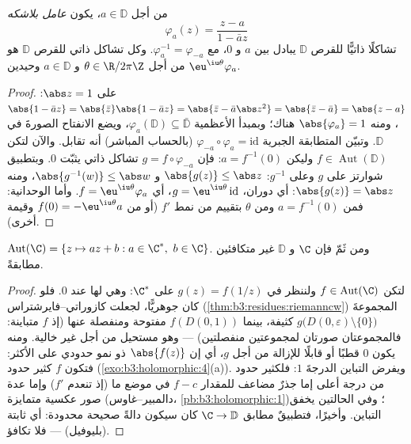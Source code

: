 \begin{theorem}
\label{thm:b3:conformal:autdisc}
من أجل $a \in \mathbb D$، يكون \emph{عامل بلاشكه}
\[
\varphi_a(z) = \frac{z - a}{1 - \bar a z}
\]
تشاكلًا ذاتيًّا للقرص $\mathbb D$ يبادل بين $a$ و $0$، مع
$\varphi_a^{-1} = \varphi_{-a}$. وكل تشاكل ذاتي للقرص $\mathbb D$ هو $\eu^{\iu\theta}\varphi_a$ من أجل
$\theta
\in \R/2\pi\Z$ و $a \in \mathbb D$ وحيدين.
\end{theorem}

\begin{proof}
على $\abs z = 1$: $\abs{1 - \bar az} = \abs{\bar z}\abs{1 -
\bar az} = \abs{\bar z - \bar a\abs z^2} = \abs{\bar z - \bar
a} = \abs{z - a}$، ومنه $\abs{\varphi_a} = 1$ هناك؛ وبمبدأ الأعظمية
$\varphi_a(\mathbb D) \subseteq \bar{\mathbb
D}$، ويضع الانفتاح الصورةَ في $\mathbb D$. وتبيّن المتطابقة
الجبرية $\varphi_{-a}\circ\varphi_a = \mathrm{id}$ (بالحساب المباشر) أنه تقابل. والآن لتكن $f \in
\operatorname{Aut}(\mathbb D)$
وليكن $a = f^{-1}(0)$: فإن $g =
f\circ\varphi_{-a}$ تشاكل ذاتي يثبّت $0$. وبتطبيق
شوارتز على $g$ وعلى $g^{-1}$: $\abs{g(z)} \leq \abs z$ و $\abs{g^{-1}(w)} \leq \abs w$، ومنه $\abs{g(z)} = \abs z$: أي
دوران، $g = \eu^{\iu\theta}\,\mathrm{id}$، أي $f =
\eu^{\iu\theta}\varphi_a$. وأما الوحدانية: فمن $a = f^{-1}(0)$
ومن $\theta$ بتقييم من نمط $f'$ (أو من $f(0) =
-\eu^{\iu\theta}a$ وقيمة أخرى).
\end{proof}

\begin{theorem}
\label{thm:b3:conformal:autplane}
$\operatorname{Aut}(\C) = \{z \mapsto az + b : a \in \C^*,\ b
\in \C\}$. ومن ثَمّ فإن $\C$ و $\mathbb D$ غير متكافئين مطابقةً.
\end{theorem}

\begin{proof}
لتكن $f \in \operatorname{Aut}(\C)$ ولننظر في $g(z) =
f(1/z)$ على $\C^*$: وهي 
لها  عند $0$. فلو كان جوهريًّا، لجعلت
كازوراتي--فايرشتراس (\cref{thm:b3:residues:riemanncw}) المجموعةَ $g\bigl(D(0,\varepsilon)\setminus\{0\}\bigr)$ كثيفة، بينما
$f(D(0, 1))$ مفتوحة ومنفصلة عنها (إذ $f$ متباينة: فالمجموعتان
صورتان لمجموعتين منفصلتين) --- وهو مستحيل من أجل 
 غير خالية. ومنه يكون $0$ قطبًا أو قابلًا
للإزالة من أجل $g$، أي إن $\abs{f(z)}$ ذو نمو حدودي على
الأكثر: فتكون $f$ كثير حدود (\cref{exo:b3:holomorphic:4}(a)). ويفرض التباين
الدرجةَ $1$: فلكثير حدود من درجة أعلى إما جذرٌ مضاعف للمقدار
$f - c$ في موضع ما (إذ تنعدم $f'$) وإما عدة صور عكسية متمايزة
(دالمبير--غاوس، \cref{pb:b3:holomorphic:1})؛ وفي الحالتين يخفق التباين. وأخيرًا،
فتطبيقٌ مطابق $\C \to
\mathbb D$ كان سيكون دالةً صحيحة محدودة: أي ثابتة
(بليوفيل) --- فلا تكافؤ.
\end{proof}

